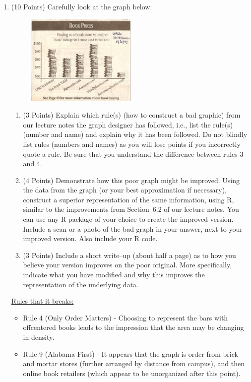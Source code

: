\documentclass[12pt,letterpaper,final]{article}
\begin{document}
\begin{enumerate}

\item (10 Points) Carefully look at the graph below:

\begin{figure}[ht]
\centerline{
\includegraphics[width=0.5\textwidth]{hw03_q01_Fig1_books.jpg}}
\end{figure}

\begin{enumerate}
\item (3 Points) Explain which rule(s) 
(how to construct a bad graphic) from our lecture notes the graph
designer has followed, i.e., list the rule(s) (number and name)
and explain why it has been followed. Do not blindly list rules (numbers and names)
as you will lose points if you incorrectly quote a rule.
Be sure that you understand the difference between rules 3 and 4.

\item (4 Points) Demonstrate how this poor graph might be improved.
Using the data from the graph (or your best approximation if necessary),
construct a superior representation of the same information, using R,
similar to the improvements from Section~6.2 of our lecture notes.
You can use any R package of your choice to create the improved version.
Include a scan or a photo of the bad graph in your answer,
next to your improved version. Also include your R code.

\item (3 Points) Include a short write--up (about half a page) as to how you 
believe your version improves on the poor original. More specifically,
indicate what you have modified and why this improves the representation
of the underlying data.

\end{enumerate}
\break

\underline{Rules that it breaks:}
\begin{itemize}
  \item Rule 4 (Only Order Matters) - Choosing to represent the bars with offcentered books leads to the impression that the area may be changing in density.
  \item Rule 9 (Alabama First) - It appears that the graph is order from brick and mortar stores (further arranged by distance from campus), and then online book retailers (which appear to be unorganized after this point).
\end{itemize}


\end{enumerate}
\end{document}
